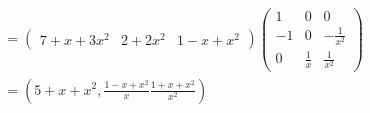 \documentclass[a4paper, 12pt]{article}
\begin{document}
\begin{solucio}
\begin{align*}
            &= 
            \left(
                \begin{array}{ccc}
                    7+x+3x^2 & 2+2x^2 & 1-x+x^2
                \end{array}
            \right)
            \left(
                \begin{array}{ccc}
                    1 & 0 & 0\\
                    -1 & 0 & -\frac{1}{x^2}\\
                    0 & \frac{1}{x} & \frac{1}{x^2}
                \end{array}
            \right)\\
            &= 
            (5+x+x^2, \frac{1 - x + x^2}{x} \frac{1 + x + x^2}{x^2})
        \end{align*}
    \end{solucio}
\end{document}

